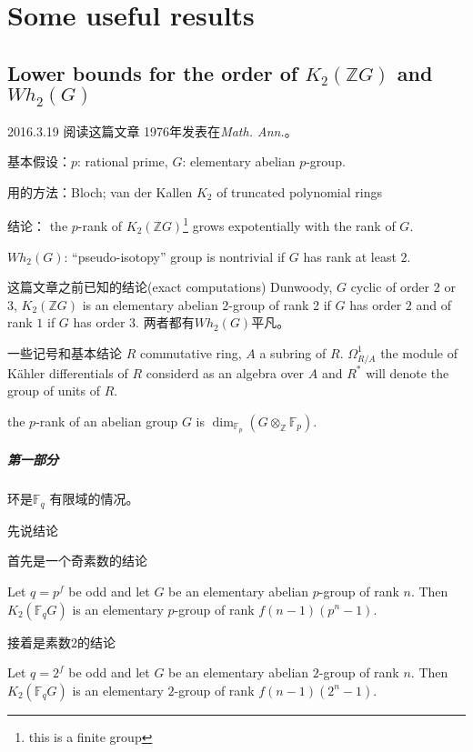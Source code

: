 \chapter{Some useful results}
\section{Lower bounds for the order of $K_2(\mathbb{Z}G)$ and $Wh_2(G)$} %
\label{sec:lower_bounds_for_the_order_of_}
2016.3.19 阅读这篇文章\cite{Stein1976} 1976年发表在{\em{Math. Ann.}}。

基本假设：$p$: rational prime, $G$: elementary abelian $p$-group.

用的方法：Bloch; van der Kallen  $K_2$ of truncated polynomial rings

结论：
the $p$-rank of $K_2(\mathbb{Z}G)$\footnote{this is a finite group} grows expotentially with the rank of $G$.

$Wh_2(G)$: ``pseudo-isotopy'' group is nontrivial if $G$ has rank at least $2$.


这篇文章之前已知的结论(exact computations)
Dunwoody, $G$ cyclic of order 2 or 3, {\color{green} $K_2(\mathbb{Z}G)$ is an elementary abelian $2$-group of rank 2 if $G$ has order $2$ and of rank $1$ if $G$ has order $3$}. 两者都有$Wh_2(G)$平凡。


一些记号和基本结论
$R$ commutative ring, $A$ a subring of $R$.
$\Omega_{R/A}^1$ the module of K\"{a}hler differentials of $R$ considerd as an algebra over $A$ and $R^*$ will denote the group of units of $R$.

the $p$-rank of an abelian group $G$ is $\dim_{\mathbb{F}_p}(G\otimes_\mathbb{Z} \mathbb{F}_p)$.

\paragraph{第一部分} %
\label{par:第一部分}
环是$\mathbb{F}_q$ 有限域的情况。

先说结论

首先是一个奇素数的结论
\begin{prop}
	Let $q=p^f$ be odd and let $G$ be an elementary abelian $p$-group of rank $n$.
	Then $K_2(\mathbb{F}_qG)$ is an elementary $p$-group of rank $f(n-1)(p^n-1)$.
\end{prop}
接着是素数$2$的结论
\begin{prop}
	Let $q=2^f$ be odd and let $G$ be an elementary abelian $2$-group of rank $n$.
	Then $K_2(\mathbb{F}_qG)$ is an elementary $2$-group of rank $f(n-1)(2^n-1)$.
\end{prop}

